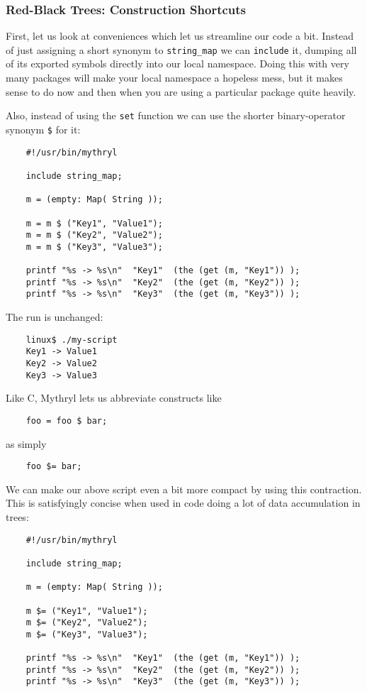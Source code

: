 \cutend*

\subsubsection{Red-Black Trees: Construction Shortcuts}

First, let us look at conveniences which let us streamline our 
code a bit.  Instead of just assigning a short synonym to 
{\tt string\_map} we can {\tt include} it, dumping all of its 
exported symbols directly into our local namespace.  Doing 
this with very many packages will make your local namespace 
a hopeless mess, but it makes sense to do now and then when 
you are using a particular package quite heavily.

Also, 
instead of using the {\tt set} function we can use the 
shorter binary-operator synonym {\tt \$} for it:

\begin{verbatim}
    #!/usr/bin/mythryl

    include string_map;

    m = (empty: Map( String ));

    m = m $ ("Key1", "Value1");
    m = m $ ("Key2", "Value2");
    m = m $ ("Key3", "Value3");

    printf "%s -> %s\n"  "Key1"  (the (get (m, "Key1")) );
    printf "%s -> %s\n"  "Key2"  (the (get (m, "Key2")) );
    printf "%s -> %s\n"  "Key3"  (the (get (m, "Key3")) );
\end{verbatim}
 
The run is unchanged:

\begin{verbatim}
    linux$ ./my-script
    Key1 -> Value1
    Key2 -> Value2
    Key3 -> Value3
\end{verbatim}

Like C, Mythryl lets us abbreviate constructs like
\begin{verbatim}
    foo = foo $ bar;
\end{verbatim}
as simply
\begin{verbatim}
    foo $= bar;
\end{verbatim}

We can make our above script even a bit more compact by using 
this contraction.  This is satisfyingly 
concise when used in code doing a lot of data accumulation 
in trees:

\begin{verbatim}
    #!/usr/bin/mythryl

    include string_map;

    m = (empty: Map( String ));

    m $= ("Key1", "Value1");
    m $= ("Key2", "Value2");
    m $= ("Key3", "Value3");

    printf "%s -> %s\n"  "Key1"  (the (get (m, "Key1")) );
    printf "%s -> %s\n"  "Key2"  (the (get (m, "Key2")) );
    printf "%s -> %s\n"  "Key3"  (the (get (m, "Key3")) );
\end{verbatim}


